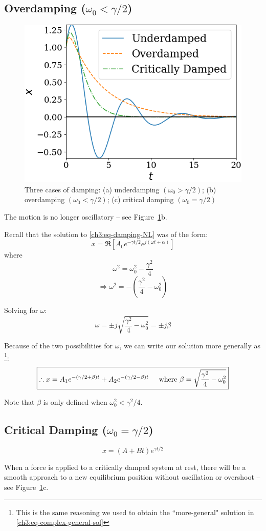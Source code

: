 \subsection{Overdamping ($ \omega_0 < \gamma/2 $)}

\begin{figure}
	\centering
	\includegraphics[scale=0.6]{phys232/Ch3-damped-oscillators-graph.png} \caption{Three cases of damping: (a) underdamping $(\omega_0>\gamma/2)$; (b) overdamping $(\omega_0<\gamma/2)$; (c) critical damping $(\omega_0=\gamma/2)$} \label{ch3:fig-damping}
\end{figure}


The motion is no longer oscillatory -- see Figure~\ref{ch3:fig-damping}b.

Recall that the solution to \eqref{ch3:eq-damping-NL} was of the form:
\[ 	x = \Re\left[ A_0 e^{-\gamma t/2} e^{j(\omega t+\alpha)} \right] \]
where
\[ \omega^2 = \omega_0^2 - \frac{\gamma^2}{4} \]
\[ \Longrightarrow \omega^2 =  -\left( \frac{\gamma^2}{4} - \omega_0^2 \right)  \]

Solving for $\omega$:
\[ \omega = \pm j\sqrt{ \frac{\gamma^2}{4}-\omega_0^2  } = \pm j\beta \]

Because of the two possibilities for $\omega$, we can write our solution more generally as%
\footnote{This is the same reasoning we used to obtain the ``more-general" solution in \eqref{ch3:eq-complex-general-sol}}:
\[ \boxed{ \therefore
	x = A_1 e^{-(\gamma/2 + \beta)t} + A_2 e^{-(\gamma/2-\beta)t} 
	\hspace{0.5cm}\text{where } \beta = \sqrt{\frac{\gamma^2}{4}-\omega_0^2} 
} \]

Note that $\beta$ is only defined when $\omega_0^2 < \gamma^2/4$.

\subsection{Critical Damping ($ \omega_0 = \gamma/2 $)}
\[ \boxed{x = (A + Bt) e^{\gamma t/2}} \]

When a force is applied to a critically damped system at rest, there will be a smooth approach to a new equilibrium position without oscillation or overshoot -- see Figure~\ref{ch3:fig-damping}c.